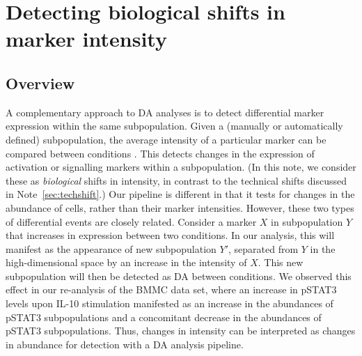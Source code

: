 \documentclass{article}
\begin{document}
\section{Detecting biological shifts in marker intensity}

\subsection{Overview}
A complementary approach to DA analyses is to detect differential marker expression within the same subpopulation.
Given a (manually or automatically defined) subpopulation, the average intensity of a particular marker can be compared between conditions \cite{behbehani2015mass,anchang2016visualization}.
This detects changes in the expression of activation or signalling markers within a subpopulation.
(In this note, we consider these as \textit{biological} shifts in intensity, in contrast to the technical shifts discussed in Note~\ref{sec:techshift}.)
Our pipeline is different in that it tests for changes in the abundance of cells, rather than their marker intensities.
However, these two types of differential events are closely related.
Consider a marker $X$ in subpopulation $Y$ that increases in expression between two conditions. 
In our analysis, this will manifest as the appearance of new subpopulation $Y'$, separated from $Y$ in the high-dimensional space by an increase in the intensity of $X$.
This new subpopulation will then be detected as DA between conditions.
We observed this effect in our re-analysis of the BMMC data set, where an increase in pSTAT3 levels upon IL-10 stimulation manifested as an increase in the abundances of pSTAT3\hi{} subpopulations and a concomitant decrease in the abundances of pSTAT3\lo{} subpopulations.
Thus, changes in intensity can be interpreted as changes in abundance for detection with a DA analysis pipeline.
\end{document}
